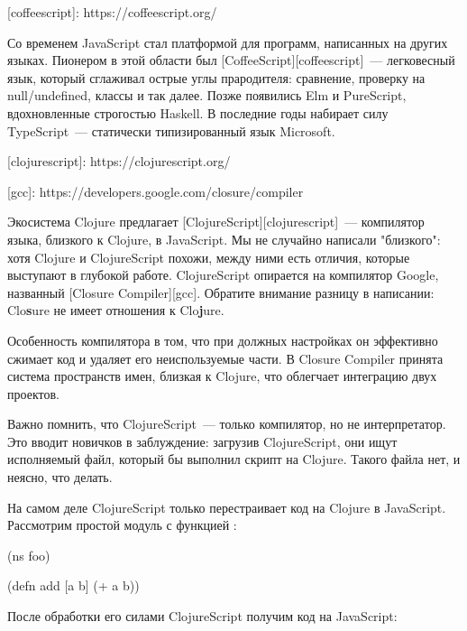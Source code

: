 [coffeescript]: https://coffeescript.org/

Со временем JavaScript стал платформой для программ, написанных на других языках. Пионером в этой области был [CoffeeScript][coffeescript]~--- легковесный язык, который сглаживал острые углы прародителя: сравнение, проверку на null/undefined, классы и так далее. Позже появились Elm и PureScript, вдохновленные строгостью Haskell. В последние годы набирает силу TypeScript~--- статически типизированный язык Microsoft.

[clojurescript]: https://clojurescript.org/

[gcc]: https://developers.google.com/closure/compiler

Экосистема Clojure предлагает [ClojureScript][clojurescript]~--- компилятор языка, близкого к Clojure, в JavaScript. Мы не случайно написали "близкого": хотя Clojure и ClojureScript похожи, между ними есть отличия, которые выступают в глубокой работе. ClojureScript опирается на компилятор Google, названный [Closure Compiler][gcc]. Обратите внимание разницу в написании: Clo\textbf{s}ure не имеет отношения к Clo\textbf{j}ure.

Особенность компилятора в том, что при должных настройках он эффективно сжимает код и удаляет его неиспользуемые части. В Closure Compiler принята система пространств имен, близкая к Clojure, что облегчает интеграцию двух проектов.

Важно помнить, что ClojureScript~--- только компилятор, но не интерпретатор. Это вводит новичков в заблуждение: загрузив ClojureScript, они ищут исполняемый файл, который бы выполнил скрипт на Clojure. Такого файла нет, и неясно, что делать.

На самом деле ClojureScript только перестраивает код на Clojure в JavaScript. Рассмотрим простой модуль  с функцией :

\begin{english}
  \begin{clojure}
(ns foo)

(defn add [a b]
  (+ a b))
  \end{clojure}
\end{english}

После обработки его силами ClojureScript получим код на JavaScript:

\begin{english}
\end{english}

